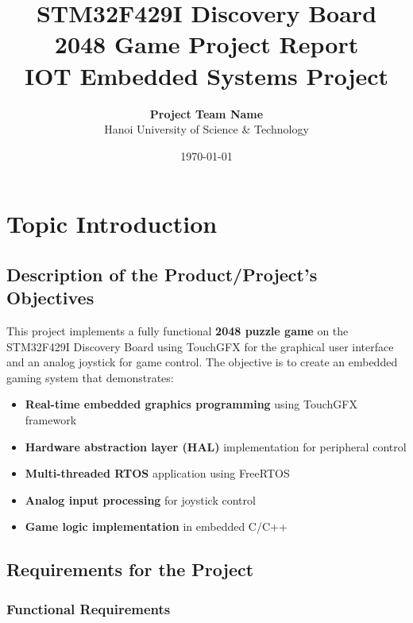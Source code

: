 \documentclass[12pt,a4paper]{article}
\title{
    \vspace{-2cm}
    \textbf{\Large STM32F429I Discovery Board\\2048 Game Project Report}\\[0.5cm]
    \large IOT Embedded Systems Project
}
\author{
    \textbf{Project Team Name}\\
    Hanoi University of Science & Technology\\[0.5cm]
}
\date{\today}
\begin{document}
\maketitle
\thispagestyle{empty}

\newpage

\tableofcontents
\newpage

\listoffigures
\newpage

\listoftables
\newpage

\section{Topic Introduction}

\subsection{Description of the Product/Project's Objectives}

This project implements a fully functional \textbf{2048 puzzle game} on the STM32F429I Discovery Board using TouchGFX for the graphical user interface and an analog joystick for game control. The objective is to create an embedded gaming system that demonstrates:

\begin{itemize}[leftmargin=*]
    \item \textbf{Real-time embedded graphics programming} using TouchGFX framework
    \item \textbf{Hardware abstraction layer (HAL)} implementation for peripheral control
    \item \textbf{Multi-threaded RTOS} application using FreeRTOS
    \item \textbf{Analog input processing} for joystick control
    \item \textbf{Game logic implementation} in embedded C/C++
\end{itemize}

\subsection{Requirements for the Project}

\subsubsection{Functional Requirements}
\end{document}
